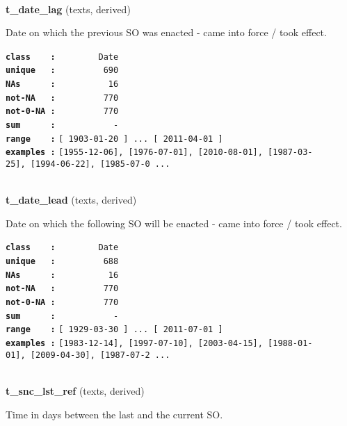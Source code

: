 \documentclass[]{article}
\begin{document}
~

\textbf{t\_date\_lag} (texts, derived)

Date on which the previous SO was enacted - came into force / took
effect.

\textbf{\texttt{class\ \ \ \ :}} \texttt{~~~~~~~~Date}\\
\textbf{\texttt{unique\ \ \ :}} \texttt{~~~~~~~~~690}\\
\textbf{\texttt{NAs\ \ \ \ \ \ :}} \texttt{~~~~~~~~~~16}\\
\textbf{\texttt{not-NA\ \ \ :}} \texttt{~~~~~~~~~770}\\
\textbf{\texttt{not-0-NA\ :}} \texttt{~~~~~~~~~770}\\
\textbf{\texttt{sum\ \ \ \ \ \ :}} \texttt{~~~~~~~~~~~-}\\
\textbf{\texttt{range\ \ \ \ :}}
\texttt{{[}\ 1903-01-20\ {]}\ ...\ {[}\ 2011-04-01\ {]}}\\
\textbf{\texttt{examples\ :}}
\texttt{{[}1955-12-06{]},\ {[}1976-07-01{]},\ {[}2010-08-01{]},\ {[}1987-03-25{]},\ {[}1994-06-22{]},\ {[}1985-07-0\ ...}\\

~

\textbf{t\_date\_lead} (texts, derived)

Date on which the following SO will be enacted - came into force / took
effect.

\textbf{\texttt{class\ \ \ \ :}} \texttt{~~~~~~~~Date}\\
\textbf{\texttt{unique\ \ \ :}} \texttt{~~~~~~~~~688}\\
\textbf{\texttt{NAs\ \ \ \ \ \ :}} \texttt{~~~~~~~~~~16}\\
\textbf{\texttt{not-NA\ \ \ :}} \texttt{~~~~~~~~~770}\\
\textbf{\texttt{not-0-NA\ :}} \texttt{~~~~~~~~~770}\\
\textbf{\texttt{sum\ \ \ \ \ \ :}} \texttt{~~~~~~~~~~~-}\\
\textbf{\texttt{range\ \ \ \ :}}
\texttt{{[}\ 1929-03-30\ {]}\ ...\ {[}\ 2011-07-01\ {]}}\\
\textbf{\texttt{examples\ :}}
\texttt{{[}1983-12-14{]},\ {[}1997-07-10{]},\ {[}2003-04-15{]},\ {[}1988-01-01{]},\ {[}2009-04-30{]},\ {[}1987-07-2\ ...}\\

~

\textbf{t\_snc\_lst\_ref} (texts, derived)

Time in days between the last and the current SO.
\end{document}
